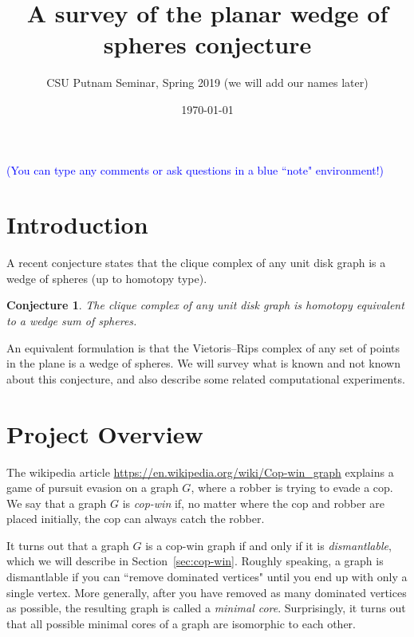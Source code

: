 \documentclass[amscd, amssymb, verbatim]{amsart}[12pt]
\newcommand{\note}[1]{\textcolor{blue}{({#1})}}
\theoremstyle{plain}
\newtheorem{conjecture}[lemma]{Conjecture}
\theoremstyle{definition}
\begin{document}
\title{
A survey of the planar wedge of spheres conjecture
}
\author{CSU Putnam Seminar, Spring 2019 (we will add our names later)}
\date{\today}
\maketitle

\note{You can type any comments or ask questions in a blue ``note" environment!}

\section{Introduction}

A recent conjecture states that the clique complex of any unit disk graph is a wedge of spheres (up to homotopy type).
\begin{conjecture}\label{conj:main}
The clique complex of any unit disk graph is homotopy equivalent to a wedge sum of spheres.
\end{conjecture}
An equivalent formulation is that the Vietoris--Rips complex of any set of points in the plane is a wedge of spheres.
We will survey what is known and not known about this conjecture, and also describe some related computational experiments.

\cite{AFV,chambers2010vietoris}


\section{Project Overview}

The wikipedia article \url{https://en.wikipedia.org/wiki/Cop-win\_graph} explains a game of pursuit evasion on a graph $G$, where a robber is trying to evade a cop. 
We say that a graph $G$ is \emph{cop-win} if, no matter where the cop and robber are placed initially, the cop can always catch the robber.

It turns out that a graph $G$ is a cop-win graph if and only if it is \emph{dismantlable}, which we will describe in Section~\ref{sec:cop-win}.
Roughly speaking, a graph is dismantlable if you can ``remove dominated vertices" until you end up with only a single vertex.
More generally, after you have removed as many dominated vertices as possible, the resulting graph is called a \emph{minimal core}. Surprisingly, it turns out that all possible minimal cores of a graph are isomorphic to each other.
\end{document}
